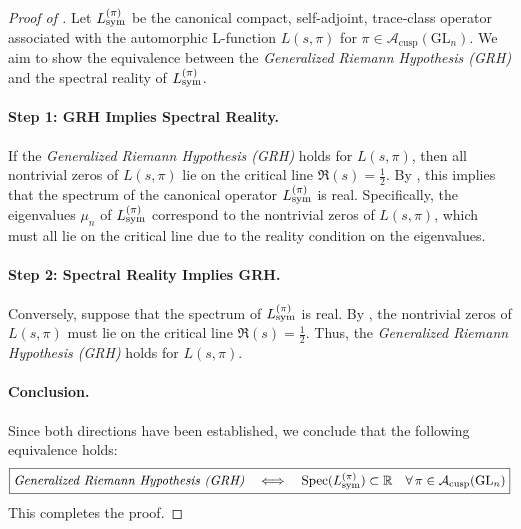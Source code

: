 \begin{proof}[Proof of ]
Let \( L_{\mathrm{sym}}^{(\pi)} \) be the canonical compact, self-adjoint, trace-class operator associated with the automorphic L-function \( L(s, \pi) \) for \( \pi \in \mathcal{A}_{\text{cusp}}(\mathrm{GL}_n) \). We aim to show the equivalence between the \emph{Generalized Riemann Hypothesis (GRH)} and the spectral reality of \( L_{\mathrm{sym}}^{(\pi)} \).

\paragraph{Step 1: GRH Implies Spectral Reality.}
If the \emph{Generalized Riemann Hypothesis (GRH)} holds for \( L(s, \pi) \), then all nontrivial zeros of \( L(s, \pi) \) lie on the critical line \( \Re(s) = \frac{1}{2} \). By , this implies that the spectrum of the canonical operator \( L_{\mathrm{sym}}^{(\pi)} \) is real. Specifically, the eigenvalues \( \mu_n \) of \( L_{\mathrm{sym}}^{(\pi)} \) correspond to the nontrivial zeros of \( L(s, \pi) \), which must all lie on the critical line due to the reality condition on the eigenvalues.

\paragraph{Step 2: Spectral Reality Implies GRH.}
Conversely, suppose that the spectrum of \( L_{\mathrm{sym}}^{(\pi)} \) is real. By , the nontrivial zeros of \( L(s, \pi) \) must lie on the critical line \( \Re(s) = \frac{1}{2} \). Thus, the \emph{Generalized Riemann Hypothesis (GRH)} holds for \( L(s, \pi) \).

\paragraph{Conclusion.}
Since both directions have been established, we conclude that the following equivalence holds:
\[
\boxed{
\textit{Generalized Riemann Hypothesis (GRH)} \quad \Longleftrightarrow \quad \operatorname{Spec}(L_{\mathrm{sym}}^{(\pi)}) \subset \mathbb{R} \quad \forall \, \pi \in \mathcal{A}_{\text{cusp}}(\mathrm{GL}_n)
}
\]
This completes the proof.
\end{proof}
